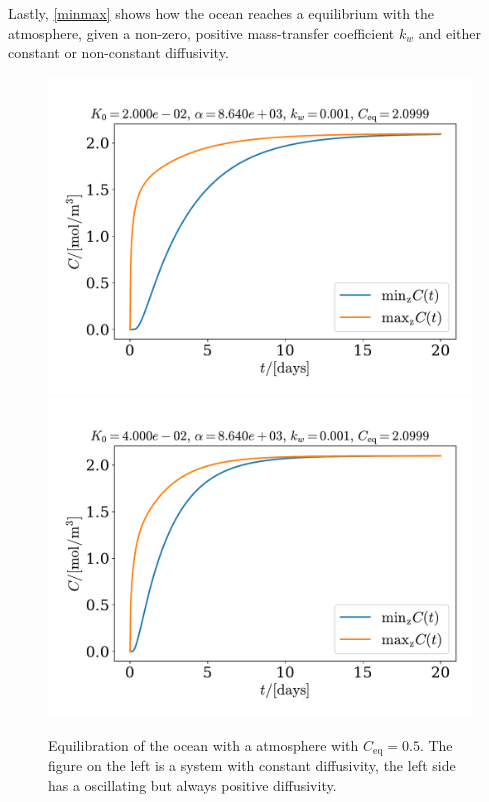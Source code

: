 \documentclass{article}
\begin{document}
    Lastly, \autoref{minmax} shows how the ocean reaches a equilibrium with the atmosphere, given a non-zero, positive mass-transfer coefficient $k_w$ and either constant or non-constant diffusivity.

    \begin{figure}
        \centering
        \includegraphics[width=.49\textwidth]{../plots/test5_minmax}
        \includegraphics[width=.49\textwidth]{../plots/test5_varK_minmax}
        \caption{Equilibration of the ocean with a atmosphere with $C_\mathrm{eq}=0.5$. The figure on the left is a system with constant diffusivity, the left side has a oscillating but always positive diffusivity.}
        \label{minmax}
    \end{figure}

    
    
\end{document}
